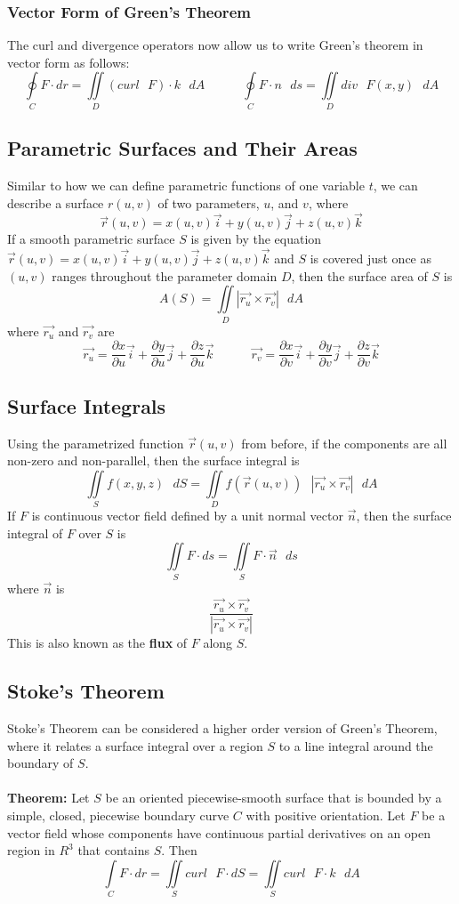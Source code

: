 \documentclass[11pt]{article}
\begin{document}
\subsubsection{Vector Form of Green's Theorem}
The curl and divergence operators now allow us to write Green's theorem in vector form as follows:
$$ \oint\limits_{C} F \cdot dr = \iint\limits_{D} (curl \text{ } F) \cdot k \text { } dA \quad \quad \quad  \oint\limits_{C} F \cdot n \text { } ds = \iint\limits_{D} div \text{ } F(x,y) \text { } dA$$
\subsection{Parametric Surfaces and Their Areas}
Similar to how we can define parametric functions of one variable $t$, we can describe a surface $r(u,v)$ of two parameters, $u$, and $v$, where
$$ \vec{r}(u,v) = x(u,v)\vec{i}+y(u,v)\vec{j}+z(u,v)\vec{k}$$
If a smooth parametric surface $S$ is given by the equation $\vec{r}(u,v) = x(u,v)\vec{i}+y(u,v)\vec{j}+z(u,v)\vec{k}$ and $S$ is covered just once as $(u,v)$ ranges throughout the parameter domain $D$, then the surface area of $S$ is  $$A(S) = \iint\limits_{D} | \vec{r_u} \times \vec{r_v} | \text { } dA$$ where $\vec{r_u}$ and $\vec{r_v}$ are $$\vec{r_u} = \frac{\partial x}{\partial u}\vec{i} +\frac{\partial y}{\partial u}\vec{j} + \frac{\partial z}{\partial u}\vec{k} \quad \quad \quad \vec{r_v} = \frac{\partial x}{\partial v}\vec{i} +\frac{\partial y}{\partial v}\vec{j} + \frac{\partial z}{\partial v}\vec{k}$$
\subsection{Surface Integrals}
Using the parametrized function $\vec{r}(u,v)$ from before, if the components are all non-zero and non-parallel, then the surface integral is 
$$ \iint\limits_{S} f(x,y,z) \text{ } dS = \iint\limits_{D} f(\vec{r}(u,v)) \text { }| \vec{r_u} \times \vec{r_v} | \text { } dA$$
If $F$ is continuous vector field defined by a unit normal vector $\vec{n}$, then the surface integral of $F$ over $S$ is $$ \iint\limits_{S} F \cdot ds =  \iint\limits_{S} F \cdot \vec{n} \text { } ds$$ where $\vec{n}$ is $$\frac{\vec{r_u} \times \vec{r_v}}{|\vec{r_u} \times \vec{r_v}|} $$
This is also known as the \textbf{flux} of $F$ along $S$.
\subsection{Stoke's Theorem}
Stoke's Theorem can be considered a higher order version of Green's Theorem, where it relates a surface integral over a region $S$ to a line integral around the boundary of $S$.
\\ \\ 
\textbf{Theorem:} Let $S$ be an oriented piecewise-smooth surface that is bounded by a simple, closed, piecewise boundary curve $C$ with positive orientation. Let $F$ be a vector field whose components have continuous partial derivatives on an open region in $R^3$ that contains $S$. Then $$\int\limits_{C} F \cdot dr = \iint\limits_{S} curl \text{ } F \cdot dS = \iint\limits_{S} curl \text{ } F \cdot k \text{ } dA$$
\pagebreak
\end{document}
